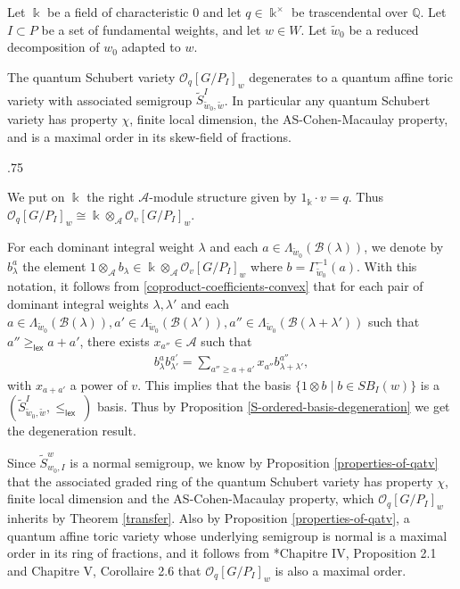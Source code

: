 \documentclass[11pt,fleqn]{article}
\makeatletter
\renewenvironment{proof}[1][\textit{Proof}]{\par
  \pushQED{\qed}%
  \normalfont \topsep.75\paraskip\relax
  \trivlist
  \item[\hskip\labelsep
        \itshape
    #1\@addpunct{.}]\ignorespaces
}{%
  \popQED\endtrivlist\@endpefalse
}
\newcommand\QQ{\mathbb Q}
\newcommand\ot{\otimes}
\newcommand\A{\mathcal A}
\newcommand\B{\mathcal B}
\newcommand\GG{\Gamma}
\renewcommand\O{\mathcal O}
\renewcommand\k{\Bbbk}
\newcommand\lex{\mathsf{lex}}
\newcommand\schubertbasis{SB}
\makeatother
\begin{document}
\begin{Theorem}
\label{Schubert-deg}
Let $\k$ be a field of characteristic $0$ and let $q \in \k^\times$ be 
trascendental over $\QQ$. Let $I \subset P$ be a set of fundamental weights, 
and let $w \in W$. Let $\tilde w_0$ be a reduced decomposition of $w_0$ 
adapted to $w$.

The quantum Schubert variety $\O_q[G/P_I]_w$ degenerates to a quantum affine 
toric variety with associated semigroup $\tilde S^I_{\tilde w_0, \tilde w}$. 
In particular any quantum Schubert variety has property $\chi$, finite local 
dimension, the AS-Cohen-Macaulay property, and is a maximal order in its 
skew-field of fractions.
\end{Theorem}
\begin{proof}
We put on $\k$ the right $\A$-module structure given by $1_\k \cdot v = q$.
Thus $\O_q[G/P_I]_w \cong \k \ot_\A \O_v[G/P_I]_w$. 

For each dominant integral weight $\lambda$ and each $a \in \Lambda_{\tilde 
w_0}
(\B(\lambda))$, we denote by $b^a_\lambda$ the element $1 \ot_\A b_\lambda
\in \k \ot_\A \O_v[G/P_I]_w$ where $b = \GG_{\tilde w_0}^{-1}(a)$.
With this notation, it follows from \ref{coproduct-coefficients-convex} that 
for each pair of dominant integral weights $\lambda, \lambda'$ and each $a \in 
\Lambda_{\tilde w_0}(\B(\lambda)), a' \in \Lambda_{\tilde w_0}(\B(\lambda')), 
a'' \in \Lambda_{\tilde w_0}(\B(\lambda + \lambda'))$ such that $a'' 
\geq_{\lex} a + a'$, there exists $x_{a''} \in \A$ such that 
\begin{align*}
b^a_{\lambda} b^{a'}_{\lambda'} = \sum_{a'' \geq a+a'} x_{a''} 
  b^{a''}_{\lambda + \lambda'},
\end{align*}
with $x_{a+a'}$ a power of $v$. This implies that the basis 
$\{1 \ot b \mid b \in \schubertbasis_I(w)\}$ is a $(\tilde S^I_{\tilde w_0, 
\tilde w}, \leq_{\lex}~)$ basis. Thus by Proposition 
\ref{S-ordered-basis-degeneration} we get the degeneration result.

Since $\tilde S^w_{w_0, I}$ is a normal semigroup, we know by Proposition 
\ref{properties-of-qatv} that the associated graded ring of the quantum 
Schubert variety has property $\chi$, finite local dimension and the 
AS-Cohen-Macaulay property, which $\O_q[G/P_I]_w$ inherits by Theorem 
\ref{transfer}. 
Also by Proposition \ref{properties-of-qatv}, a quantum affine toric variety 
whose underlying semigroup is normal is a maximal order in its ring of 
fractions, and it follows from \cite{Mau}*{Chapitre IV, Proposition 2.1 and 
Chapitre V, Corollaire 2.6} that $\O_q[G/P_I]_w$ is also a maximal order. 
\end{proof}
\end{document}

